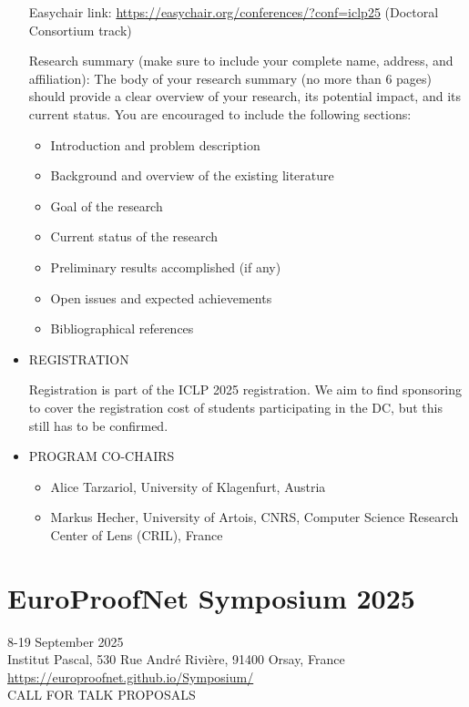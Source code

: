 \documentclass[prodmode,acmtecs]{acmsmall} %
\begin{document}
\begin{itemize}
  Easychair link: \href{https://easychair.org/conferences/?conf=iclp25}{https://easychair.org/conferences/?conf=iclp25} (Doctoral Consortium track) 
 
  Research summary (make sure to include your complete name, address, and affiliation): The body of your research summary (no more than 6 pages) should provide a clear overview of your research, its potential impact, and its current status. You are encouraged to include the following sections: 
 
\begin{itemize}\item  Introduction and problem description
\item  Background and overview of the existing literature
\item  Goal of the research
\item  Current status of the research
\item  Preliminary results accomplished (if any)
\item  Open issues and expected achievements
\item  Bibliographical references
\end{itemize} 
\item  REGISTRATION 
 
  Registration is part of the ICLP 2025 registration. We aim to find sponsoring to cover the registration cost of students participating in the DC, but this still has to be confirmed. 
 
\item  PROGRAM CO-CHAIRS 
 
\begin{itemize}\item  Alice Tarzariol, University of Klagenfurt, Austria
\item  Markus Hecher, University of Artois, CNRS, Computer Science Research Center of Lens (CRIL), France
\end{itemize} 
\end{itemize}\section{EuroProofNet Symposium 2025}\label{EuroProofNetSymposium2025}  8-19 September 2025\\ 
  Institut Pascal, 530 Rue André Rivière, 91400 Orsay, France\\ 
  \href{https://europroofnet.github.io/Symposium/}{https://europroofnet.github.io/Symposium/}\\ 
CALL FOR TALK PROPOSALS 
\end{document}
